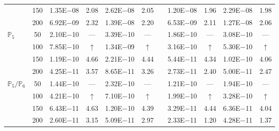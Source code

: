 \begin{table}[H]
{\begin{tabular}{@{}l c c c c c c c c c c@{}}
 & 150 & 1.35E$-$08 & 2.08  & 2.62E$-$08 & 2.05 &  & 1.20E$-$08 & 1.96 & 2.29E$-$08 & 1.98\\
 & 200 & 6.92E$-$09 & 2.32  & 1.39E$-$08 & 2.20 &  & 6.53E$-$09 & 2.11 & 1.27E$-$08 & 2.06\\
\midrule
\multirow{4}{*}{$\mathbb{P}_{5}$}
 & 50 & 2.10E$-$10 & ---  & 3.39E$-$10 & --- &  & 1.86E$-$10 & --- & 3.08E$-$10 & ---\\
 & 100 & 7.85E$-$10 & $\uparrow$  & 1.34E$-$09 & $\uparrow$ &  & 3.16E$-$10 & $\uparrow$ & 5.30E$-$10 & $\uparrow$\\
 & 150 & 1.19E$-$10 & 4.66  & 2.21E$-$10 & 4.44 &  & 5.44E$-$11 & 4.34 & 1.02E$-$10 & 4.06\\
 & 200 & 4.25E$-$11 & 3.57  & 8.65E$-$11 & 3.26 &  & 2.73E$-$11 & 2.40 & 5.00E$-$11 & 2.47\\
\midrule
\multirow{4}{*}{$\mathbb{P}_{5}/\mathbb{P}_{6}$}
 & 50 & 1.44E$-$10 & ---  & 2.32E$-$10 & --- &  & 1.21E$-$10 & --- & 1.94E$-$10 & ---\\
 & 100 & 4.21E$-$10 & $\uparrow$  & 7.10E$-$10 & $\uparrow$ &  & 1.99E$-$10 & $\uparrow$ & 3.28E$-$10 & $\uparrow$\\
 & 150 & 6.43E$-$11 & 4.63  & 1.20E$-$10 & 4.39 &  & 3.29E$-$11 & 4.44 & 6.36E$-$11 & 4.04\\
 & 200 & 2.60E$-$11 & 3.15  & 5.09E$-$11 & 2.97 &  & 2.33E$-$11 & 1.20 & 4.28E$-$11 & 1.37\\
\bottomrule
\end{tabular}}
\label{none}
\end{table}
